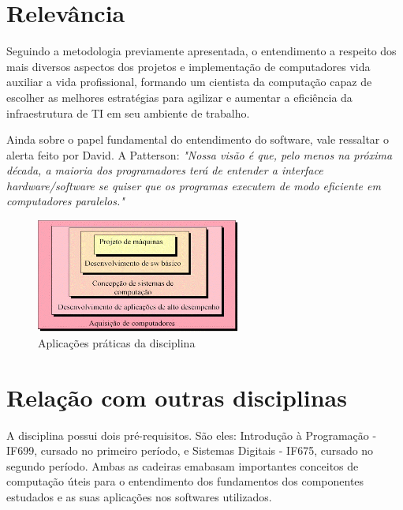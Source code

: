 \documentclass[12pt]{article}
\begin{document}
	\section{Relevância}
	\label{sec:relevancia}
	
	    Seguindo a metodologia previamente apresentada, o entendimento a respeito dos mais diversos aspectos dos projetos e implementação de computadores vida  auxiliar a vida profissional, formando um cientista da computação capaz de escolher as melhores estratégias para agilizar e aumentar a eficiência da infraestrutura de TI em seu ambiente de trabalho.
	    
	    Ainda sobre o papel fundamental do entendimento do software, vale ressaltar o alerta feito por David. A Patterson: \emph{"Nossa visão é que, pelo menos na próxima década, a maioria dos programadores terá de entender a interface hardware/software se quiser que os programas executem de modo eficiente em computadores paralelos."}\citep{organizacao_projeto}
	    
        \begin{figure}[!h]
         \centering
         \includegraphics[width=0.6\textwidth]{figures/aplicacoes.png}
         \caption{Aplicações práticas da disciplina \citep{IF674}}
         \label{fig:aplicacoes}
        \end{figure}

	\section{Relação com outras disciplinas}
	\label{sec:relacao}
	
        A disciplina possui dois pré-requisitos. São eles: Introdução à Programação - IF699, cursado no primeiro período, e Sistemas Digitais - IF675, cursado no segundo período. Ambas as cadeiras emabasam importantes conceitos de computação úteis para o entendimento dos fundamentos dos componentes estudados e as suas aplicações nos softwares utilizados.
	
    
	
	
\end{document}
